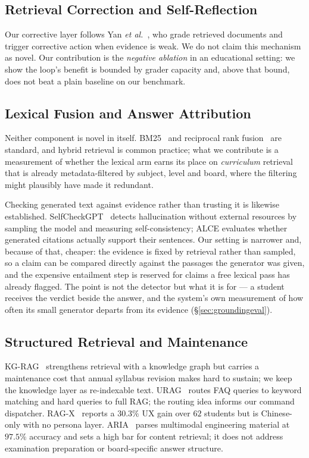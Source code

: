 \documentclass[conference]{IEEEtran}
\begin{document}
\subsection{Retrieval Correction and Self-Reflection}
Our corrective layer follows Yan \textit{et al.}~\cite{yan2024crag}, who grade
retrieved documents and trigger corrective action when evidence is weak. We do
not claim this mechanism as novel. Our contribution is the
\emph{negative ablation} in an educational setting: we show the loop's benefit
is bounded by grader capacity and, above that bound, does not beat a plain
baseline on our benchmark.

\subsection{Lexical Fusion and Answer Attribution}
Neither component is novel in itself. BM25~\cite{robertson2009} and reciprocal rank
fusion~\cite{cormack2009} are standard, and hybrid retrieval is common practice;
what we contribute is a measurement of whether the lexical arm earns its place
on \emph{curriculum} retrieval that is already metadata-filtered by subject,
level and board, where the filtering might plausibly have made it redundant.

Checking generated text against evidence rather than trusting it is likewise
established. SelfCheckGPT~\cite{manakul2023} detects hallucination without
external resources by sampling the model and measuring self-consistency; ALCE
\cite{gao2023} evaluates whether generated citations actually support their
sentences. Our setting is narrower and, because of that, cheaper: the evidence
is fixed by retrieval rather than sampled, so a claim can be compared directly
against the passages the generator was given, and the expensive entailment step
is reserved for claims a free lexical pass has already flagged. The point is not
the detector but what it is for --- a student receives the verdict beside the
answer, and the system's own measurement of how often its small generator
departs from its evidence (§\ref{sec:groundingeval}).

\subsection{Structured Retrieval and Maintenance}
KG-RAG~\cite{dong2025} strengthens retrieval with a knowledge graph but carries
a maintenance cost that annual syllabus revision makes hard to sustain; we keep
the knowledge layer as re-indexable text. URAG~\cite{nguyen2025} routes FAQ
queries to keyword matching and hard queries to full RAG; the routing idea
informs our command dispatcher. RAG-X~\cite{he2025} reports a $30.3\%$ UX gain
over $62$ students but is Chinese-only with no persona layer.
ARIA~\cite{luo2026} parses multimodal engineering material at $97.5\%$ accuracy
and sets a high bar for content retrieval; it does not address examination
preparation or board-specific answer structure.
\end{document}

